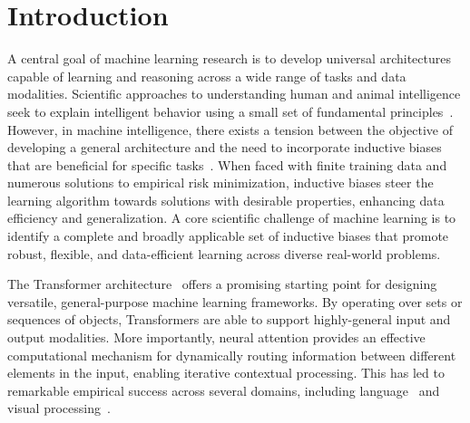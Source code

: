 \section{Introduction}\label{sec:intro}


A central goal of machine learning research is to develop universal architectures capable of learning and reasoning across a wide range of tasks and data modalities. Scientific approaches to understanding human and animal intelligence seek to explain intelligent behavior using a small set of fundamental principles~\citep{marcus2003algebraic}. However, in machine intelligence, there exists a tension between the objective of developing a general architecture and the need to incorporate inductive biases that are beneficial for specific tasks~\citep{wolpert1995no,baxter2000model}. When faced with finite training data and numerous solutions to empirical risk minimization, inductive biases steer the learning algorithm towards solutions with desirable properties, enhancing data efficiency and generalization.
A core scientific challenge of machine learning is to identify a complete and broadly applicable set of inductive biases that promote robust, flexible, and data-efficient learning across diverse real-world problems.


The Transformer architecture~\citep{vaswani2017attention} offers a promising starting point for designing versatile, general-purpose machine learning frameworks. By operating over sets or sequences of objects, Transformers are able to support highly-general input and output modalities. More importantly, neural attention provides an effective computational mechanism for dynamically routing information between different elements in the input, enabling iterative contextual processing. This has led to remarkable empirical success across several domains, including language~\citep{radfordImprovingLanguageUnderstanding2018,devlinBERTPretrainingDeep2019,radford2019language,kaplan2020scalinglawsneurallanguage,brown2020languagemodelsfewshotlearners} and visual processing~\citep{dosovitskiyImageWorth16x162020,carion2020end,zhai2022scaling}.


